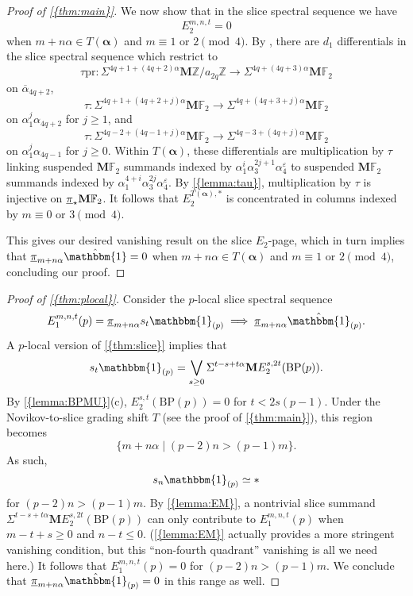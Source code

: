 \documentclass[10pt]{amsart}
\numberwithin{equation}{section}
\theoremstyle{plain}
\theoremstyle{definition}
\theoremstyle{remark}
\begin{document}
\begin{proof}[Proof of {\autoref{{thm:main}}}]
We now show that in the slice spectral sequence we have
\[
  E_2^{m,n,t} = 0
\]
when $m+n\alpha\in T(\boldsymbol\alpha)$ and $m\equiv 1$ or $2\pmod{4}$.  By \cite[Lemma 4.2]{RSO:pi1}, there are $d_1$ differentials in the slice spectral sequence which restrict to
\[
  \tau \mathrm{pr}:\Sigma^{4q+1+(4q+2)\alpha}{\mathbf{M}}{\mathbb{Z}}/a_{2q}{\mathbb{Z}}\to \Sigma^{4q+(4q+3)\alpha}{\mathbf{M}}{\mathbb{F}}_2
\]
on $\overline{\alpha}_{4q+2}$,
\[
  \tau:\Sigma^{4q+1+(4q+2+j)\alpha}{\mathbf{M}}{\mathbb{F}}_2\to \Sigma^{4q+(4q+3+j)\alpha}{\mathbf{M}}{\mathbb{F}}_2
\]
on $\alpha_1^j\alpha_{4q+2}$ for $j\ge 1$, and
\[
 \tau:\Sigma^{4q-2+(4q-1+j)\alpha}{\mathbf{M}}{\mathbb{F}}_2\to \Sigma^{4q-3+(4q+j)\alpha}{\mathbf{M}}{\mathbb{F}}_2
\]
on $\alpha_1^j\alpha_{4q-1}$ for $j\ge 0$.  Within $T(\boldsymbol\alpha)$, these differentials are multiplication by $\tau$ linking suspended ${\mathbf{M}}{\mathbb{F}}_2$ summands indexed by $\alpha_1^i\alpha_3^{2j+1}\alpha_4^\varepsilon$ to suspended ${\mathbf{M}}{\mathbb{F}}_2$ summands indexed by $\alpha_1^{4+i}\alpha_3^{2j}\alpha_4^\varepsilon$.  By {\autoref{{lemma:tau}}}, multiplication by $\tau$ is injective on ${\underline{\smash{\pi}}}_\star {\mathbf{M}}{\mathbb{F}}_2$.  It follows that $E_2^{T(\boldsymbol\alpha),*}$ is concentrated in columns indexed by $m\equiv 0\text{ or }3\pmod{4}$.

This gives our desired vanishing result on the slice $E_2$-page, which in turn implies that ${\underline{\smash{\pi}}}_{m+n\alpha}\hat{\mathbbm{1}} = 0$ when $m+n\alpha\in T(\boldsymbol\alpha)$ and $m\equiv 1\text{ or }2\pmod{4}$, concluding our proof.
\end{proof}

\begin{proof}[Proof of {\autoref{{thm:plocal}}}]
Consider the $p$-local slice spectral sequence
\[
  E_1^{m,n,t}(p) = {\underline{\smash{\pi}}}_{m+n\alpha}s_t{\mathbbm{1}}_{(p)}\implies {\underline{\smash{\pi}}}_{m+n\alpha}\hat{\mathbbm{1}}_{(p)}.
\]
A $p$-local version of {\autoref{{thm:slice}}} implies that
\[
  s_t {\mathbbm{1}}_{(p)} = \bigvee_{s\ge 0}\Sigma^{t-s+t\alpha}{\mathbf{M}} E_2^{s,2t}({\mathrm{BP}}(p)).
\]
By {\autoref{{lemma:BPMU}}}(c), $E_2^{s,t}({\mathrm{BP}}(p))= 0$ for $t<2s(p-1)$.  Under the Novikov-to-slice  grading shift $T$ (see the proof of {\autoref{{thm:main}}}), this region becomes
\[
  \{m+n\alpha\mid (p-2)n>(p-1)m\}.
\]
As such,
\[
  s_n {\mathbbm{1}}_{(p)} \simeq *
\]
for $(p-2)n>(p-1)m$.  By {\autoref{{lemma:EM}}}, a nontrivial slice summand $\Sigma^{t-s+t\alpha}{\mathbf{M}} E_2^{s,2t}({\mathrm{BP}}(p))$ can only contribute to $E_1^{m,n,t}(p)$ when $m-t+s\ge 0$ and $n-t\le 0$.  ({\autoref{{lemma:EM}}} actually provides a more stringent vanishing condition, but this ``non-fourth quadrant'' vanishing is all we need here.)  It follows that $E_1^{m,n,t}(p) = 0$ for $(p-2)n>(p-1)m$.  We conclude that ${\underline{\smash{\pi}}}_{m+n\alpha}\hat{\mathbbm{1}}_{(p)} = 0$ in this range as well.
\end{proof}
\end{document}
